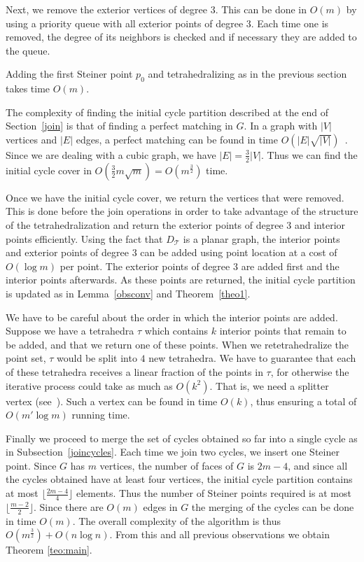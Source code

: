 \documentclass{article}
\begin{document}
Next, we remove the exterior vertices of degree $3$.
This can be done in $O(m)$ by using a priority queue with
all exterior points of degree $3$. Each time one is removed,
the degree of its neighbors is checked and if necessary they
are added to the queue.\par


Adding the first Steiner point $p_0$ and tetrahedralizing 
as in the previous section takes time $O(m)$.\par

The complexity of finding the initial cycle partition described
at the end of Section~\ref{join}
is that of finding 
a perfect matching in $G$. In a graph with $|V|$ vertices and $|E|$ 
edges, a perfect matching can be found  in time 
$O(|E| \sqrt{ |V|})$~\cite{micali}. Since we are dealing
with a cubic graph, we have $|E|=\frac{3}{2} |V|$. Thus we can 
find the initial cycle cover in 
$O(\frac{3}{2} m \sqrt{m})=O(m^\frac{3}{2})$ time.\par

Once we have the initial cycle cover, we return the vertices 
that were removed. This is done before the 
join operations in order to take advantage of the structure
of the tetrahedralization and return the exterior points of
degree $3$ and interior points efficiently.
Using the fact that $D_\mathcal{T}$ is a planar graph, the 
interior points and exterior points of degree $3$ can be 
added using point location at a cost of $O(\log m)$ per point.
The exterior points
of degree $3$ are added first and the interior points afterwards.
As these points are returned, the initial cycle partition is
updated as in Lemma~\ref{obsconv} and Theorem~\ref{theo1}.\par

We have to be careful about the order 
in which the interior points are added.
Suppose we have a tetrahedra $\tau$ which contains $k$ 
interior points that remain to be added, and that 
we return one of these points.  When we 
retetrahedralize the point set, $\tau$ would be 
split  into $4$ new tetrahedra.
We have to guarantee that each of these tetrahedra 
receives a linear fraction of the points
in $\tau$, for otherwise the 
iterative process could take as much as 
$O(k^2)$. That is, we need a splitter vertex (see~\cite{avis}).
Such a vertex can be found in time $O(k)$, thus ensuring a 
total of $O(m'\log m)$ running time.\par

Finally we proceed to merge the set of cycles obtained so
far into a single cycle as in Subsection~\ref{joincycles}.
Each time we join two cycles, we insert one Steiner point.
Since $G$ has $m$ vertices, the number of faces of $G$
is $2m-4$, and since all the cycles obtained have at least
four vertices, the initial cycle partition contains at most 
$\lfloor \frac{2m-4}{4} \rfloor$ elements. Thus the number of
Steiner points required is at most $\lfloor \frac{m-2}{2} \rfloor$.
Since there are $O(m)$ edges 
in $G$ the merging of the cycles can be done in time $O(m)$.
The overall complexity of the algorithm is thus 
$O(m^\frac{3}{2}) +  O(n \log n)$. From this and all previous observations
we obtain Theorem \ref{teo:main}.\par
\end{document}
